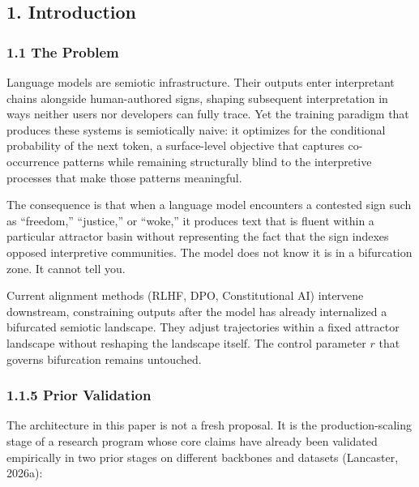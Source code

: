 \documentclass[
  11pt]{article}
\begin{document}
\subsection{1. Introduction}\label{introduction}

\subsubsection{1.1 The Problem}\label{the-problem}

Language models are semiotic infrastructure. Their outputs enter
interpretant chains alongside human-authored signs, shaping subsequent
interpretation in ways neither users nor developers can fully trace. Yet
the training paradigm that produces these systems is semiotically naive:
it optimizes for the conditional probability of the next token, a
surface-level objective that captures co-occurrence patterns while
remaining structurally blind to the interpretive processes that make
those patterns meaningful.

The consequence is that when a language model encounters a contested
sign such as ``freedom,'' ``justice,'' or ``woke,'' it produces text
that is fluent within a particular attractor basin without representing
the fact that the sign indexes opposed interpretive communities. The
model does not know it is in a bifurcation zone. It cannot tell you.

Current alignment methods (RLHF, DPO, Constitutional AI) intervene
downstream, constraining outputs after the model has already
internalized a bifurcated semiotic landscape. They adjust trajectories
within a fixed attractor landscape without reshaping the landscape
itself. The control parameter \(r\) that governs bifurcation remains
untouched.

\subsubsection{1.1.5 Prior Validation}\label{prior-validation}

The architecture in this paper is not a fresh proposal. It is the
production-scaling stage of a research program whose core claims have
already been validated empirically in two prior stages on different
backbones and datasets (Lancaster, 2026a):
\end{document}
